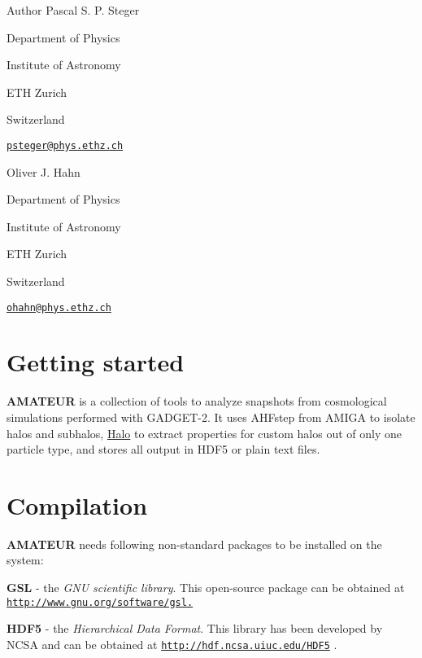 \begin{DoxyAuthor}{Author}
Pascal S. P. Steger \par
 Department of Physics \par
 Institute of Astronomy \par
 ETH Zurich \par
 Switzerland \par
 \href{mailto:psteger@phys.ethz.ch}{\tt psteger@phys.ethz.ch} \par


Oliver J. Hahn \par
 Department of Physics \par
 Institute of Astronomy \par
 ETH Zurich \par
 Switzerland \par
 \href{mailto:ohahn@phys.ethz.ch}{\tt ohahn@phys.ethz.ch} \par
 \par

\end{DoxyAuthor}
\hypertarget{index_prelim}{}\section{Getting started}\label{index_prelim}
{\bfseries AMATEUR} is a collection of tools to analyze snapshots from cosmological simulations performed with GADGET-\/2. It uses AHFstep from AMIGA to isolate halos and subhalos, \hyperlink{classHalo}{Halo} to extract properties for custom halos out of only one particle type, and stores all output in HDF5 or plain text files.\hypertarget{index_install}{}\section{Compilation}\label{index_install}
{\bfseries AMATEUR} needs following non-\/standard packages to be installed on the system:


\begin{DoxyItemize}
\item {\bfseries GSL} -\/ the {\itshape GNU scientific library\/}. This open-\/source package can be obtained at \href{http://www.gnu.org/software/gsl.}{\tt http://www.gnu.org/software/gsl.}
\end{DoxyItemize}


\begin{DoxyItemize}
\item {\bfseries HDF5} -\/ the {\itshape Hierarchical Data Format\/}. This library has been developed by NCSA and can be obtained at \href{http://hdf.ncsa.uiuc.edu/HDF5}{\tt http://hdf.ncsa.uiuc.edu/HDF5} .
\end{DoxyItemize}


